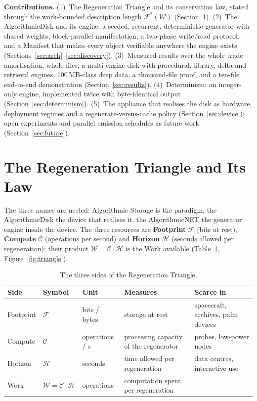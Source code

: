 \documentclass[11pt,a4paper]{article}
\theoremstyle{definition}
\theoremstyle{plain}
\theoremstyle{remark}
\newcommand{\anet}{AlgorithmicNET}
\newcommand{\adisk}{AlgorithmicDisk}
\newcommand{\astor}{Algorithmic Storage}
\newcommand{\Foot}{\mathcal{F}}
\newcommand{\Comp}{\mathcal{C}}
\newcommand{\Hori}{\mathcal{H}}
\newcommand{\Work}{\mathcal{W}}
\begin{document}
\textbf{Contributions.} (1)~The Regeneration Triangle and its conservation law, stated through
the work-bounded description length $\Foot^{*}(\Work)$ (Section~\ref{sec:law}). (2)~The
\adisk{} and its engine: a seeded, recurrent, deterministic generator with shared weights,
block-parallel manifestation, a two-phase write/read protocol, and a Manifest that makes every
object verifiable anywhere the engine exists (Sections~\ref{sec:arch}--\ref{sec:discovery}).
(3)~Measured results over the whole trade---amortisation, whole files, a multi-engine disk with
procedural, library, delta and retrieval engines, 100\,MB-class deep data, a thousand-file proof,
and a ten-file end-to-end demonstration (Section~\ref{sec:results}). (4)~Determinism: an
integer-only engine, implemented twice with byte-identical output (Section~\ref{sec:determinism}).
(5)~The appliance that realises the disk as hardware, deployment regimes and a
regenerate-versus-cache policy (Section~\ref{sec:device}); open experiments and parallel emission
schedules as future work (Section~\ref{sec:future}).

\section{The Regeneration Triangle and Its Law}
\label{sec:law}
The three names are nested: \astor{} is the paradigm, the \adisk{} the device that realises it,
the \anet{} the generator engine inside the device. The three resources are \textbf{Footprint}
$\Foot$ (bits at rest), \textbf{Compute} $\Comp$ (operations per second) and \textbf{Horizon}
$\Hori$ (seconds allowed per regeneration); their product $\Work=\Comp\cdot\Hori$ is the Work
available (Table~\ref{tab:sides}, Figure~\ref{fig:triangle}).

\begin{table}[!htb]
\centering\footnotesize
\caption{The three sides of the Regeneration Triangle.}
\label{tab:sides}
\begin{tabular}{@{}llp{2.2cm}p{4.4cm}p{4.2cm}@{}}
\toprule
\textbf{Side} & \textbf{Symbol} & \textbf{Unit} & \textbf{Measures} & \textbf{Scarce in} \\
\midrule
Footprint & $\Foot$ & bits / bytes & storage at rest & spacecraft, archives, palm devices \\
Compute & $\Comp$ & operations / s & processing capacity of the regenerator & probes, low-power nodes \\
Horizon & $\Hori$ & seconds & time allowed per regeneration & data centres, interactive use \\
Work & $\Work=\Comp\cdot\Hori$ & operations & computation spent per regeneration & --- \\
\bottomrule
\end{tabular}
\end{table}
\end{document}
